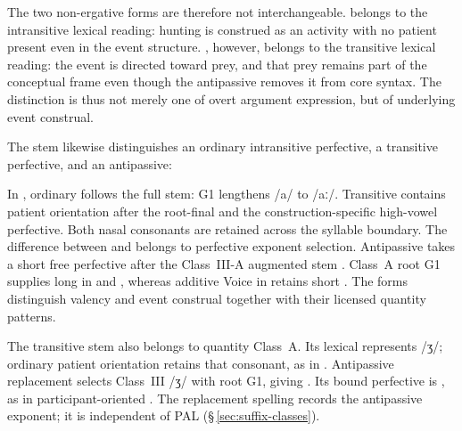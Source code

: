 The two non-ergative forms are therefore not interchangeable. 
belongs to the intransitive lexical reading: hunting is construed as an activity
with no patient present even in the event structure. , however,
belongs to the transitive lexical reading: the event is directed toward prey,
and that prey remains part of the conceptual frame even though the antipassive
removes it from core syntax. The distinction is thus not merely one of overt
argument expression, but of underlying event construal.

The stem  likewise distinguishes an ordinary intransitive perfective,
a transitive perfective, and an antipassive:

\pex
\a {} 
\a {} 
\a {} 
\xe

In , ordinary  follows the full stem: G1 lengthens
/a/ to /aː/. Transitive  contains patient orientation
 after the root-final  and the construction-specific
high-vowel perfective. Both nasal consonants are retained across the
syllable boundary. The difference between  and  belongs to
perfective exponent selection. Antipassive  takes a short
free perfective after the Class~III-A augmented stem .
Class~A root G1 supplies long  in  and ,
whereas additive Voice in  retains short .
The forms distinguish valency and event construal together with their
licensed quantity patterns.

The transitive stem   also belongs to quantity
Class~A. Its lexical  represents /ʒ/; ordinary patient orientation
retains that consonant, as in .
Antipassive replacement selects Class~III /ʒ/ with root G1, giving
. Its bound perfective is
, as in participant-oriented .
The replacement spelling  records the antipassive exponent;
it is independent of PAL (§\,\ref{sec:suffix-classes}).

